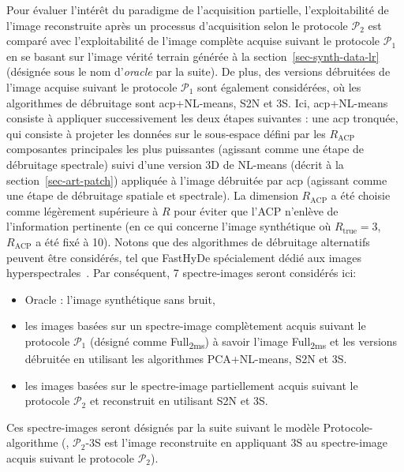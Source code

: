 Pour évaluer l'intérêt du paradigme de l'acquisition partielle, l'exploitabilité de l'image reconstruite après un processus d'acquisition selon le protocole $\mathcal{P}_2$ est comparé avec l'exploitabilité de l'image complète acquise suivant le protocole $\mathcal{P}_1$ en se basant sur l'image vérité terrain générée à la section~\ref{sec-synth-data-lr} (désignée sous le nom d'\emph{oracle} par la suite). De plus, des versions débruitées de l'image acquise suivant le protocole $\mathcal{P}_1$ sont également considérées, où les algorithmes de débruitage sont \gls{acp}+NL-means, S2N et 3S. Ici, \gls{acp}+NL-means consiste à appliquer successivement les deux étapes suivantes : une \gls{acp} tronquée, qui consiste à projeter les données sur le sous-espace défini par les $R_{\mathrm{ACP}}$ composantes principales les plus puissantes (agissant comme une étape de débruitage spectrale) suivi d'une version 3D de NL-means (décrit à la section~\ref{sec-art-patch}) appliquée à l'image débruitée par \gls{acp} (agissant comme une étape de débruitage spatiale et spectrale).
%
La dimension $R_{\mathrm{ACP}}$ a été choisie comme légèrement supérieure à $R$ pour éviter que l'ACP n'enlève de l'information pertinente (en ce qui concerne l'image synthétique où $R_{\mathrm{true}}=3$, $R_{\mathrm{ACP}}$ a été fixé à 10). Notons que des algorithmes de débruitage alternatifs peuvent être considérés, tel que FastHyDe spécialement dédié aux images hyperspectrales~\cite{bioucaspaper}. Par conséquent, 7 spectre-images seront considérés ici:
\begin{itemize}
    \item Oracle : l'image synthétique sans bruit,
    \item les images basées sur un spectre-image complètement acquis suivant le protocole $\mathcal{P}_1$ (désigné comme Full\textsubscript{2ms}) à savoir l'image Full\textsubscript{2ms} et les versions débruitée en utilisant les algorithmes PCA+NL-means, S2N et 3S.
    \item les images basées sur le spectre-image partiellement acquis suivant le protocole $\mathcal{P}_2$ et reconstruit en utilisant S2N et 3S.
\end{itemize}
Ces spectre-images seront désignés par la suite suivant le modèle Protocole-algorithme (\eg{}, $\mathcal{P}_2$-3S est l'image reconstruite en appliquant 3S au spectre-image acquis suivant le protocole $\mathcal{P}_2$).

